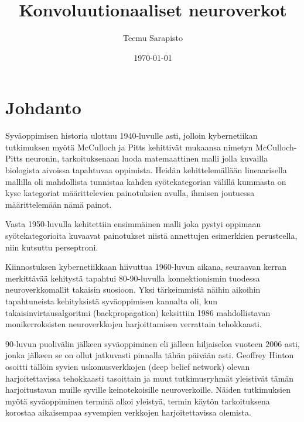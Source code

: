 \documentclass[finnish]{tktltiki2}
\title{Konvoluutionaaliset neuroverkot}
\author{Teemu Sarapisto}
\date{\today}
\theoremstyle{definition}
\theoremstyle{remark}
\begin{document}

  \frontmatter      %

  \maketitle        %
  \makeabstract     %

  \tableofcontents  %


  \mainmatter       %

  \section{Johdanto}
   Syväoppimisen historia ulottuu 1940-luvulle asti, jolloin kybernetiikan tutkimuksen myötä McCulloch ja Pitts kehittivät mukaansa nimetyn McCulloch-Pitts neuronin, tarkoituksenaan luoda matemaattinen malli jolla kuvailla biologista aivoissa tapahtuvaa oppimista. Heidän kehittelemällään lineaarisella mallilla oli mahdollista tunnistaa kahden syötekategorian välillä kummasta on kyse kategoriat määrittelevien painotuksien avulla, ihmisen joutuessa määrittelemään nämä painot.

  Vasta 1950-luvulla kehitettiin ensimmäinen malli joka pystyi oppimaan syötekategorioita kuvaavat painotukset niistä annettujen esimerkkien perusteella, niin kutsuttu perseptroni.

  Kiinnostuksen kybernetiikkaan hiivuttua 1960-luvun aikana, seuraavan kerran merkittävää kehitystä tapahtui 80-90-luvulla konnektionismin tuodessa neuroverkkomallit takaisin suosioon. Yksi tärkeimmistä näihin aikoihin tapahtuneista kehityksistä syväoppimisen kannalta oli, kun takaisinvirtausalgoritmi (backpropagation) keksittiin 1986 mahdollistavan monikerroksisten neuroverkkojen harjoittamisen verrattain tehokkaasti.

  90-luvun puolivälin jälkeen syväoppiminen eli jälleen hiljaiseloa vuoteen 2006 asti, jonka jälkeen se on ollut jatkuvasti pinnalla tähän päivään asti. Geoffrey Hinton osoitti tällöin syvien uskomusverkkojen (deep belief network) olevan harjoitettavissa tehokkaasti tasoittain ja muut tutkimusryhmät yleistivät tämän harjoitustavan muille syville keinotekoisille neuroverkoille. Näiden tutkimuksien myötä syväoppiminen terminä alkoi yleistyä, termin käytön tarkoituksena korostaa aikaisempaa syvempien verkkojen harjoitettavissa olemista.
\end{document}
